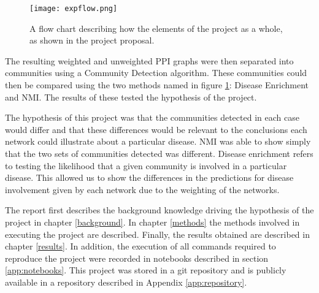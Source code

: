 \begin{figure}
    \centering
    \texttt{[image: expflow.png]}
    \caption{A flow chart describing how the elements of the project as a whole, as shown in the project proposal.}
    \label{fig:expflow}
\end{figure}

The resulting weighted and unweighted PPI graphs were then separated into communities using a Community Detection algorithm.
These communities could then be compared using the two methods named in figure \ref{fig:expflow}: Disease Enrichment and NMI.
The results of these tested the hypothesis of the project. %

The hypothesis of this project was that the communities detected in each case would differ and that these differences would be relevant to the conclusions each network could illustrate about a particular disease.
NMI was able to show simply that the two sets of communities detected was different. %
Disease enrichment refers to testing the likelihood that a given community is involved in a particular disease. %
This allowed us to show the differences in the predictions for disease involvement given by each network due to the weighting of the networks.

The report first describes the background knowledge driving the hypothesis of the project in chapter \ref{background}.
In chapter \ref{methods} the methods involved in executing the project are described.
Finally, the results obtained are described in chapter \ref{results}.
In addition, the execution of all commands required to reproduce the project were recorded in notebooks described in section \ref{app:notebooks}.
This project was stored in a git repository and is publicly available in a repository described in Appendix \ref{app:repository}.

